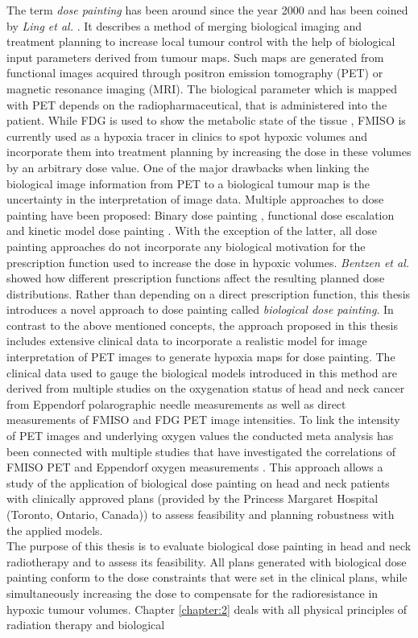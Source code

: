The term \textit{dose painting} has been around since the year 2000 and has been coined by \textit{Ling et al.} \cite{pmid10837935}. It describes a method of merging biological imaging and treatment planning to increase local tumour control with the help of biological input parameters derived from tumour maps. Such maps are generated from functional images acquired through positron emission tomography (PET) or magnetic resonance imaging (MRI). The biological parameter which is mapped with PET depends on the radiopharmaceutical, that is administered into the patient. While FDG is used to show the metabolic state of the tissue \cite{pmid16841141}, FMISO is currently used as a hypoxia tracer in clinics to spot hypoxic volumes and incorporate them into treatment planning by increasing the dose in these volumes by an arbitrary dose value. One of the major drawbacks when linking the biological image information from PET to a biological tumour map is the uncertainty in the interpretation of image data. Multiple approaches to dose painting have been proposed: Binary dose painting \cite{pmid20855118, pmid11240261, pmid17869020}, functional dose escalation \cite{pmid12587912, pmid21356478, pmid20643512, pmid18635895} and kinetic model dose painting \cite{pmid17448882}. With the exception of the latter, all dose painting approaches do not incorporate any biological motivation for the prescription function used to increase the dose in hypoxic volumes. \textit{Bentzen et al.} \cite{pmid19218733} showed how different prescription functions affect the resulting planned dose distributions. Rather than depending on a direct prescription function, this thesis introduces a novel approach to dose painting called \textit{biological dose painting}. In contrast to the above mentioned concepts, the approach proposed in this thesis includes extensive clinical data to incorporate a realistic model for image interpretation of PET images to generate hypoxia maps for dose painting. The clinical data used to gauge the biological models introduced in this method are derived from multiple studies on the oxygenation status of head and neck cancer from Eppendorf polarographic needle measurements as well as direct measurements of FMISO and FDG PET image intensities. To link the intensity of PET images and underlying oxygen values the conducted meta analysis has been connected with multiple studies that have investigated the correlations of FMISO PET and Eppendorf oxygen measurements \cite{pmid17598907, pmid12865184, pmid20831480}. This approach allows a study of the application of biological dose painting on head and neck patients with clinically approved plans (provided by the Princess Margaret Hospital (Toronto, Ontario, Canada)) to assess feasibility and planning robustness with the applied models.\\The purpose of this thesis is to evaluate biological dose painting in head and neck radiotherapy and to assess its feasibility. All plans generated with biological dose painting conform to the dose constraints that were set in the clinical plans, while simultaneously increasing the dose to compensate for the radioresistance in hypoxic tumour volumes. Chapter \ref{chapter:2} deals with all physical principles of radiation therapy and biological 